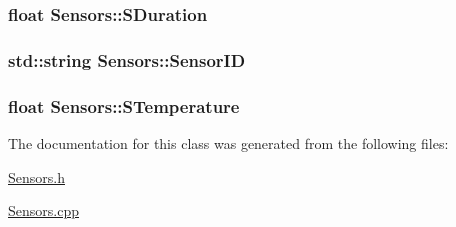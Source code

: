 \subsubsection[{\texorpdfstring{S\+Duration}{SDuration}}]{\setlength{\rightskip}{0pt plus 5cm}float Sensors\+::\+S\+Duration\hspace{0.3cm}{\ttfamily [private]}}\hypertarget{classSensors_a2ade524f8dd7fa8e562537baaeca7dbb}{}\label{classSensors_a2ade524f8dd7fa8e562537baaeca7dbb}
\subsubsection[{\texorpdfstring{Sensor\+ID}{SensorID}}]{\setlength{\rightskip}{0pt plus 5cm}std\+::string Sensors\+::\+Sensor\+ID\hspace{0.3cm}{\ttfamily [private]}}\hypertarget{classSensors_af958fb92b4e443b51edcff4a7991c927}{}\label{classSensors_af958fb92b4e443b51edcff4a7991c927}
\subsubsection[{\texorpdfstring{S\+Temperature}{STemperature}}]{\setlength{\rightskip}{0pt plus 5cm}float Sensors\+::\+S\+Temperature\hspace{0.3cm}{\ttfamily [private]}}\hypertarget{classSensors_acdc1e3b69e2607f117ff52806a46011b}{}\label{classSensors_acdc1e3b69e2607f117ff52806a46011b}


The documentation for this class was generated from the following files\+:\begin{DoxyCompactItemize}
\item 
\hyperlink{Sensors_8h}{Sensors.\+h}\item 
\hyperlink{Sensors_8cpp}{Sensors.\+cpp}\end{DoxyCompactItemize}
